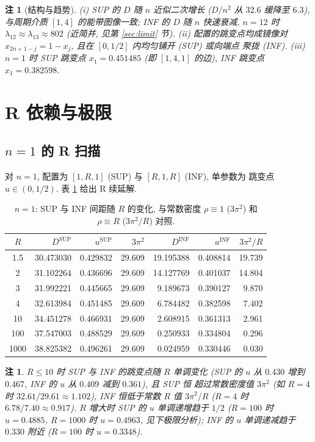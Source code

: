 \documentclass[UTF8]{ctexart}
\newtheorem{remark}[theorem]{注}
\begin{document}
\begin{remark}[结构与趋势]
	(i) SUP 的 $D$ 随 $n$ 近似二次增长 ($D/n^2$ 从 $32.6$ 缓降至 $6.3$),
	与周期介质 $[1,4]$ 的能带图像一致; INF 的 $D$ 随 $n$ 快速衰减,
	$n = 12$ 时 $\lambda_{12} \approx \lambda_{13} \approx 802$ (近简并,
	见第 \ref{sec:limit} 节). (ii) 配置的跳变点均成镜像对
	$x_{2n+1-j} = 1 - x_j$, 且在 $[0, 1/2]$ 内均匀铺开 (SUP) 或向端点
	聚拢 (INF). (iii) $n=1$ 时 SUP 跳变点 $x_1 = 0.451485$ (即
	$[1,4,1]$ 的边), INF 跳变点 $x_1 = 0.382598$.
\end{remark}

\section{R 依赖与极限}\label{sec:rscan}

\subsection{\texorpdfstring{$n=1$}{n=1} 的 R 扫描}

对 $n=1$, 配置为 $[1, R, 1]$ (SUP) 与 $[R, 1, R]$ (INF), 单参数为
跳变点 $u \in (0, 1/2)$. 表 \ref{tab:rscan} 给出 R 续延解.

\begin{table}[ht]
\centering
\caption{$n=1$: SUP 与 INF 间距随 $R$ 的变化, 与常数密度 $\rho\equiv1$
($3\pi^2$) 和 $\rho\equiv R$ ($3\pi^2/R$) 对照.}
\label{tab:rscan}
\begin{tabular}{c|rrr|rrr}
	$R$ & $D^{\mathrm{SUP}}$ & $u^{\mathrm{SUP}}$ & $3\pi^2$ &
	$D^{\mathrm{INF}}$ & $u^{\mathrm{INF}}$ & $3\pi^2/R$ \\\hline
1.5 & 30.473030 & 0.429832 & 29.609 & 19.195388 & 0.408814 & 19.739\\
2 & 31.102264 & 0.436696 & 29.609 & 14.127769 & 0.401037 & 14.804\\
3 & 31.992221 & 0.445665 & 29.609 & 9.189673 & 0.390127 & 9.870\\
4 & 32.613984 & 0.451485 & 29.609 & 6.784482 & 0.382598 & 7.402\\
10 & 34.451278 & 0.466931 & 29.609 & 2.608915 & 0.361313 & 2.961\\
100 & 37.547003 & 0.488529 & 29.609 & 0.250933 & 0.334804 & 0.296\\
1000 & 38.825382 & 0.496261 & 29.609 & 0.024959 & 0.330446 & 0.030\\
\end{tabular}
\end{table}

\begin{remark}
	$R \leq 10$ 时 SUP 与 INF 的跳变点随 $R$ 单调变化 (SUP 的 $u$ 从 $0.430$ 增到 $0.467$, INF 的 $u$ 从 $0.409$ 减到 $0.361$), 且 SUP 恒
	超过常数密度值 $3\pi^2$ (如 $R=4$ 时 $32.61/29.61 \approx 1.102$),
	INF 恒低于常数 $R$ 值 $3\pi^2/R$ ($R=4$ 时 $6.78/7.40 \approx 0.917$).
	$R$ 增大时 SUP 的 $u$ 单调递增趋于 $1/2$ ($R=100$ 时 $u = 0.4885$,
	$R=1000$ 时 $u = 0.4963$, 见下极限分析); INF 的 $u$ 单调递减趋于
	$0.330$ 附近 ($R=100$ 时 $u = 0.3348$).
\end{remark}
\end{document}
